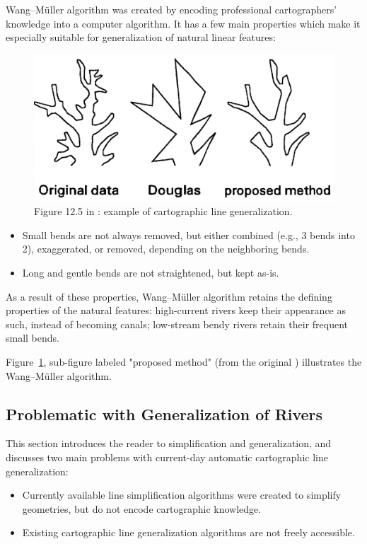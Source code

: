 \documentclass[a4paper]{article}
\newcommand{\titlecite}[1]{\citetitle{#1}\cite{#1}}
\newcommand{\WM}{Wang--M{\"u}ller}
\begin{document}
{\WM} algorithm was created by encoding professional cartographers' knowledge
into a computer algorithm. It has a few main properties which make it
especially suitable for generalization of natural linear features:

\begin{figure}[h!]
    \centering
    \includegraphics[width=.8\textwidth]{wang125}
    \caption{Figure 12.5 in \cite{wang1998line}: example of cartographic line
    generalization.}
    \label{fig:wang125}
\end{figure}

\begin{itemize}
    \item Small bends are not always removed, but either combined (e.g.,
        3 bends into 2), exaggerated, or removed, depending on the neighboring
        bends.
    \item Long and gentle bends are not straightened, but kept as-is.
\end{itemize}

As a result of these properties, {\WM} algorithm retains the defining
properties of the natural features: high-current rivers keep their appearance
as such, instead of becoming canals; low-stream bendy rivers retain their
frequent small bends.

Figure~\ref{fig:wang125}, sub-figure labeled "proposed method" (from the
original \titlecite{wang1998line}) illustrates the {\WM} algorithm.

\subsection{Problematic with Generalization of Rivers}

This section introduces the reader to simplification and generalization, and
discusses two main problems with current-day automatic cartographic line
generalization:

\begin{itemize}
    \item Currently available line simplification algorithms were created
        to simplify geometries, but do not encode cartographic knowledge.

    \item Existing cartographic line generalization algorithms are not freely
        accessible.
\end{itemize}
\end{document}
